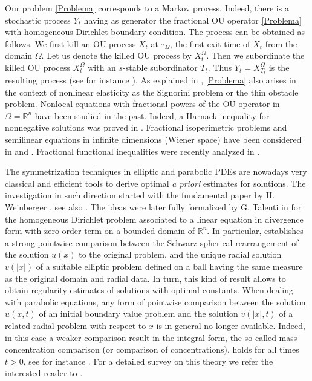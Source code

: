 \documentclass[a4paper,10pt,reqno]{amsart}
\newcommand{\R}{\mathbb{R}}
\numberwithin{equation}{section}
\begin{document}
Our problem \eqref{Problema} corresponds to a Markov process. Indeed,
there is a stochastic process $Y_t$ having as generator the fractional OU operator
\eqref{Problema} with homogeneous Dirichlet boundary condition.
The process can be obtained as follows.
We first kill an OU process $X_t$ at $\tau_\Omega$, the first exit time of $X_t$
from the domain $\Omega$. Let us denote the killed OU process by $X_t^\Omega$.
Then we subordinate the killed OU process $X_t^\Omega$ with an $s$-stable
subordinator $T_t$. Thus $Y_t=X^\Omega_{T_t}$ is the resulting process (see for instance \cite{Applebaum}).
As explained in \cite{Caffarelli-Stinga}, \eqref{Problema} also arises in the context of
nonlinear elasticity as the Signorini problem or the thin obstacle problem.
Nonlocal equations with fractional powers of the OU operator in $\Omega=\R^n$ have been
studied in the past. Indeed, a Harnack inequality for nonnegative solutions was proved in \cite{Stinga-Zhang}.
Fractional isoperimetric problems and semilinear equations in infinite
dimensions (Wiener space) have been considered in \cite{NPS} and \cite{NPS2}.
Fractional functional inequalities were recently analyzed in \cite{Caffarelli-Sire}.

The symmetrization techniques in elliptic and parabolic PDEs are nowadays very classical and efficient tools
to derive optimal \textit{a priori} estimates for solutions.
The investigation in such direction started with the fundamental paper by
H. Weinberger \cite{Wein62}, see also \cite{Maz}. The ideas were later fully formalized by
G. Talenti in \cite{Ta1} for the homogeneous Dirichlet problem
associated to a linear equation in divergence form with zero order term
on a bounded domain of $\R^{n}$.
In particular, \cite{Ta1} establishes a strong pointwise comparison between the Schwarz spherical rearrangement
of the solution $u(x)$ to the original problem, and the unique radial solution $v(|x|)$ of a suitable elliptic problem
defined on a ball having the same measure as the original domain and radial data.
In turn, this kind of result allows to obtain regularity estimates of solutions with optimal constants.
When dealing with parabolic equations, any form of pointwise comparison between the solution $u(x,t)$ of an
initial boundary value problem and the solution $v(|x|,t)$ of a related radial problem with respect to $x$
is in general no longer available. Indeed, in this case a weaker comparison result in the integral form, the so-called mass concentration comparison (or
comparison of concentrations), holds for all times $t>0$, see for instance \cite{Band2,Mossino}.  For a detailed survey
on this theory we refer the interested reader to \cite{VAZSURV}.
\end{document}
